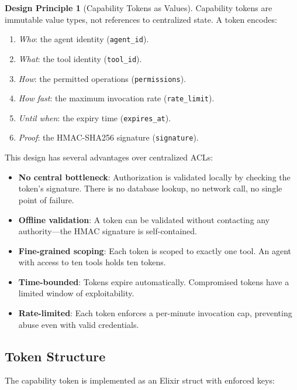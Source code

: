 \documentclass[12pt,a4paper]{article}
\theoremstyle{plain}
\theoremstyle{definition}
\newtheorem{designprinciple}[theorem]{Design Principle}
\begin{document}
\begin{designprinciple}[Capability Tokens as Values]
\label{dp:cap-values}
Capability tokens are immutable value types, not references to centralized state. A token encodes:
\begin{enumerate}
\item \emph{Who}: the agent identity (\texttt{agent\_id}).
\item \emph{What}: the tool identity (\texttt{tool\_id}).
\item \emph{How}: the permitted operations (\texttt{permissions}).
\item \emph{How fast}: the maximum invocation rate (\texttt{rate\_limit}).
\item \emph{Until when}: the expiry time (\texttt{expires\_at}).
\item \emph{Proof}: the HMAC-SHA256 signature (\texttt{signature}).
\end{enumerate}
\end{designprinciple}

This design has several advantages over centralized ACLs:

\begin{itemize}[leftmargin=2em]
\item \textbf{No central bottleneck}: Authorization is validated locally by checking the token's signature. There is no database lookup, no network call, no single point of failure.
\item \textbf{Offline validation}: A token can be validated without contacting any authority---the HMAC signature is self-contained.
\item \textbf{Fine-grained scoping}: Each token is scoped to exactly one tool. An agent with access to ten tools holds ten tokens.
\item \textbf{Time-bounded}: Tokens expire automatically. Compromised tokens have a limited window of exploitability.
\item \textbf{Rate-limited}: Each token enforces a per-minute invocation cap, preventing abuse even with valid credentials.
\end{itemize}

\subsection{Token Structure}

The capability token is implemented as an Elixir struct with enforced keys:
\end{document}
